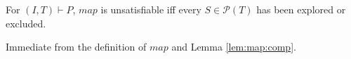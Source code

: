
\begin{corollary}
\label{cor:map:cc}
For $(I, T) \vdash P$, $map$ is unsatisfiable iff every $S \in
\mathcal{P}(T)$ has been explored or excluded.
\end{corollary}
\begin{IEEEproof}
Immediate from the definition of $map$ and Lemma \ref{lem:map:comp}.
\end{IEEEproof}


